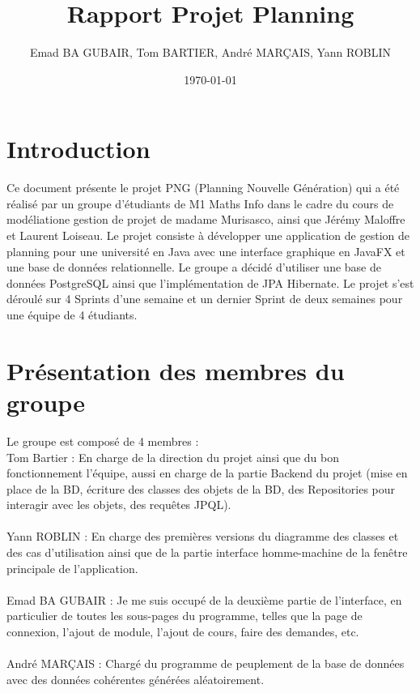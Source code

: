 \documentclass[a4paper,12pt]{article}
\title{Rapport Projet Planning}
\author{Emad BA GUBAIR, Tom BARTIER, André MARÇAIS, Yann ROBLIN}
\date{\today}
\begin{document}
\maketitle

\tableofcontents
\newpage
\section{Introduction}
Ce document présente le projet PNG (Planning Nouvelle Génération) qui a été réalisé par un groupe d'étudiants
de M1 Maths Info dans le cadre du cours de modéliatione gestion de projet de madame Murisasco, ainsi que 
Jérémy Maloffre et Laurent Loiseau. Le projet consiste à développer une application
de gestion de planning pour une université en Java avec une interface graphique en JavaFX et une base de données
relationnelle. Le groupe a décidé d'utiliser une base de données PostgreSQL ainsi que l'implémentation de JPA Hibernate.
Le projet s'est déroulé sur 4 Sprints d'une semaine et un dernier Sprint de deux semaines pour une équipe de 
4 étudiants.
\section{Présentation des membres du groupe}
Le groupe est composé de 4 membres :\\
Tom Bartier : En charge de la direction du projet ainsi que du bon fonctionnement l'équipe, aussi en charge de la partie
Backend du projet (mise en place de la BD, écriture des classes des objets de la BD, des Repositories pour interagir avec les objets, 
des requêtes JPQL).\\\\
Yann ROBLIN : En charge des premières versions du diagramme des classes et des cas d'utilisation ainsi que de la partie 
interface homme-machine de la fenêtre principale de l'application.
\\\\
Emad BA GUBAIR :   Je me suis occupé de la deuxième partie de l’interface, en particulier de toutes les sous-pages du programme, 
telles que la page de connexion, l’ajout de module, l’ajout de cours, faire des demandes, etc.\\\\
André MARÇAIS : Chargé du programme de peuplement de la base de données avec des données cohérentes générées aléatoirement. \\\\
\end{document}

